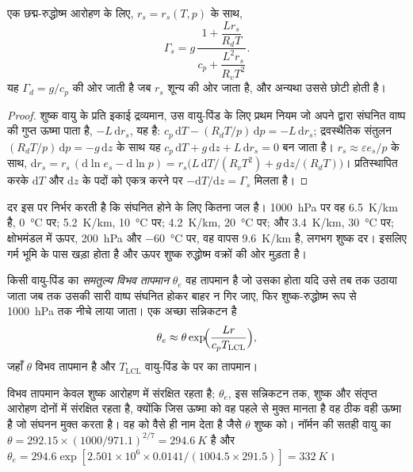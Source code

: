 \begin{proposition}[संतृप्त रुद्धोष्म तापह्रास दर]\label{prop:b2:atmospheric-thermodynamics:gamma-s}
एक छद्म-रुद्धोष्म आरोहण के लिए, $r_s = r_s(T, p)$ के साथ,
\[
  \Gamma_s = g\,\frac{1 + \dfrac{L r_s}{R_d T}}{c_p + \dfrac{L^2 r_s}{R_v T^2}} .
\]
यह $\Gamma_d = g/c_p$ की ओर जाती है जब $r_s$ शून्य की ओर जाता है, और अन्यथा उससे छोटी होती है।
\end{proposition}

\begin{proof}
शुष्क वायु के प्रति इकाई द्रव्यमान, उस वायु-पिंड के लिए प्रथम नियम जो अपने द्वारा संघनित वाष्प की गुप्त ऊष्मा
पाता है, $-L\,\mathrm{d}r_s$, यह है: $c_p\,\mathrm{d}T - (R_dT/p)\,\mathrm{d}p = -L\,
\mathrm{d}r_s$; द्रवस्थैतिक संतुलन $(R_dT/p)\,\mathrm{d}p = -g\,\mathrm{d}z$ के साथ यह
$c_p\,\mathrm{d}T + g\,\mathrm{d}z + L\,\mathrm{d}r_s = 0$ बन जाता है। $r_s \approx \varepsilon e_s/p$ के साथ,
$\mathrm{d}r_s = r_s\,(\mathrm{d}\ln e_s - \mathrm{d}\ln p) = r_s\bigl(L\,\mathrm{d}T/(R_vT^2) +
g\,\mathrm{d}z/(R_dT)\bigr)$। प्रतिस्थापित करके $\mathrm{d}T$ और
$\mathrm{d}z$ के पदों को एकत्र करने पर $-\mathrm{d}T/\mathrm{d}z = \Gamma_s$ मिलता है।
\end{proof}

दर इस पर निर्भर करती है कि संघनित होने के लिए कितना जल है। \qty{1000}{hPa} पर वह
\qty{6.5}{K/km} है, \qty{0}{\celsius} पर; \qty{5.2}{K/km}, \qty{10}{\celsius} पर;
\qty{4.2}{K/km}, \qty{20}{\celsius} पर; और \qty{3.4}{K/km}, \qty{30}{\celsius} पर; क्षोभमंडल में ऊपर,
\qty{200}{hPa} और \qty{-60}{\celsius} पर, वह वापस \qty{9.6}{K/km} है, लगभग शुष्क दर। इसलिए
 गर्म भूमि के पास खड़ा होता है और ऊपर शुष्क रुद्धोष्म वक्रों की ओर मुड़ता है।

\begin{definition}[समतुल्य विभव तापमान]\label{def:b2:atmospheric-thermodynamics:theta-e}
किसी वायु-पिंड का \emph{समतुल्य विभव तापमान} $\theta_e$
वह तापमान है जो उसका होता यदि उसे तब तक उठाया जाता जब तक उसकी सारी वाष्प संघनित होकर
बाहर न गिर जाए, फिर शुष्क-रुद्धोष्म रूप से \qty{1000}{hPa} तक नीचे लाया जाता। एक अच्छा सन्निकटन है
\[
  \theta_e \approx \theta \exp\!\Bigl(\frac{L r}{c_p T_{\text{LCL}}}\Bigr),
\]
जहाँ $\theta$ विभव तापमान है और $T_{\text{LCL}}$ वायु-पिंड के
 पर का तापमान।
\end{definition}

विभव तापमान केवल शुष्क आरोहण में संरक्षित रहता है; $\theta_e$, इस सन्निकटन तक, शुष्क और संतृप्त
आरोहण दोनों में संरक्षित रहता है, क्योंकि जिस ऊष्मा को वह पहले से मुक्त मानता है
वह ठीक वही ऊष्मा है जो संघनन मुक्त करता है। वह  को वैसे ही नाम देता है जैसे $\theta$ शुष्क को।
नॉर्मन की सतही वायु का $\theta = 292.15 \times (1000/971.1)^{2/7} = \qty{294.6}{K}$ है और
$\theta_e = 294.6 \exp[2.501 \times 10^6 \times 0.0141/(1004.5 \times 291.5)] = \qty{332}{K}$।

